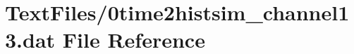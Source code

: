 \hypertarget{0time2histsim__channel13_8dat}{}\section{Text\+Files/0time2histsim\+\_\+channel13.dat File Reference}
\label{0time2histsim__channel13_8dat}
